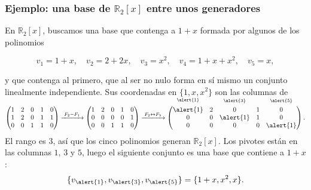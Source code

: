 \begin{frame}
    \frametitle{Ejemplo: una base de \(\mathbb{R}_2[x]\) entre unos generadores}

    \begin{example}
        En \(\mathbb{R}_2[x]\), buscamos una base que contenga a \(1+x\)
        formada por algunos de los polinomios

        \vspace{-10pt}

        \[
            v_1=1+x,\quad v_2=2+2x,\quad v_3=x^2,\quad v_4=1+x+x^2,\quad v_5=x,
        \]

        \vspace{-0pt}

        y que contenga al primero, que al ser no nulo forma en sí mismo un conjunto linealmente independiente.
        Sus coordenadas en \(\{1,x,x^2\}\) son las columnas de

        \medskip

        \[
            \begin{pmatrix}
                1&2&0&1&0\\
                1&2&0&1&1\\
                0&0&1&1&0
            \end{pmatrix}
            \xrightarrow{\;F_2-F_1\;}
            \begin{pmatrix}
                1&2&0&1&0\\
                0&0&0&0&1\\
                0&0&1&1&0
            \end{pmatrix}
            \xrightarrow{\;F_2\leftrightarrow F_3\;}
            \begin{pmatrix}
                \smash{\overset{\raisebox{1.5ex}{$\scriptstyle\alert{1}$}}{\alert{1}}}&2&\smash{\overset{\raisebox{1.5ex}{$\scriptstyle\alert{3}$}}{0}}&1&\smash{\overset{\raisebox{1.5ex}{$\scriptstyle\alert{5}$}}{0}}\\
                0&0&\alert{1}&1&0\\
                0&0&0&0&\alert{1}
            \end{pmatrix}.
        \]
        El rango es \(3\), así que los cinco polinomios generan
        \(\mathbb{R}_2[x]\). Los pivotes están en las columnas \(1\),
        \(3\) y \(5\), luego el siguiente conjunto es una base que contiene a \(1+x\):
        \[
            \{v_{\alert{1}}, v_{\alert{3}}, v_{\alert{5}}\} = \{1+x, x^2, x\}.
        \]
    \end{example}
\end{frame}


